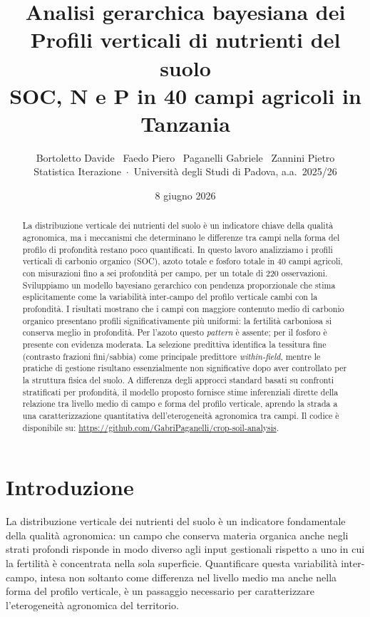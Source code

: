 \documentclass[11pt, a4paper]{article}
\title{%
  {\Large Analisi gerarchica bayesiana dei}\\[4pt]
  {\huge\bfseries Profili verticali di nutrienti del suolo}\\[4pt]
  {\large\bfseries SOC, N e P in 40 campi agricoli in Tanzania}
}
\author{
  Bortoletto Davide \, Faedo Piero \, Paganelli Gabriele \, Zannini Pietro \\[4pt]
  {\small Statistica Iterazione \,$\cdot$\, Universit\`a degli Studi di Padova, a.a.~2025/26}
}
\date{8 giugno 2026}
\begin{document}
\renewcommand{\abstractname}{Abstract}
\maketitle
\thispagestyle{empty}

\begin{abstract}
\noindent
La distribuzione verticale dei nutrienti del suolo è un indicatore chiave della qualità agronomica, ma i meccanismi che determinano le differenze tra campi nella forma del profilo di profondità restano poco quantificati. In questo lavoro analizziamo i profili verticali di carbonio organico (SOC), azoto totale e fosforo totale in 40 campi agricoli, con misurazioni fino a sei profondità per campo, per un totale di 220 osservazioni. Sviluppiamo un modello bayesiano gerarchico con pendenza proporzionale che stima esplicitamente come la variabilità inter-campo del profilo verticale cambi con la profondità. I risultati mostrano che i campi con maggiore contenuto medio di carbonio organico presentano profili significativamente più uniformi: la fertilità carboniosa si conserva meglio in profondità. Per l'azoto questo \textit{pattern} è assente; per il fosforo è presente con evidenza moderata. La selezione predittiva identifica la tessitura fine (contrasto frazioni fini/sabbia) come principale predittore \textit{within-field}, mentre le pratiche di gestione risultano essenzialmente non significative dopo aver controllato per la struttura fisica del suolo. A differenza degli approcci standard basati su confronti stratificati per profondità, il modello proposto fornisce stime inferenziali dirette della relazione tra livello medio di campo e forma del profilo verticale, aprendo la strada a una caratterizzazione quantitativa dell'eterogeneità agronomica tra campi.
Il codice è disponibile su: \url{https://github.com/GabriPaganelli/crop-soil-analysis}.
\end{abstract}

\newpage
\tableofcontents
\newpage

\section{Introduzione}
\label{sec:intro}


La distribuzione verticale dei nutrienti del suolo è un indicatore fondamentale della qualità agronomica: un campo che conserva materia organica anche negli strati profondi risponde in modo diverso agli input gestionali rispetto a uno in cui la fertilità è concentrata nella sola superficie. Quantificare questa variabilità inter-campo, intesa non soltanto come differenza nel livello medio ma anche nella forma del profilo verticale, è un passaggio necessario per caratterizzare l'eterogeneità agronomica del territorio.
\end{document}
